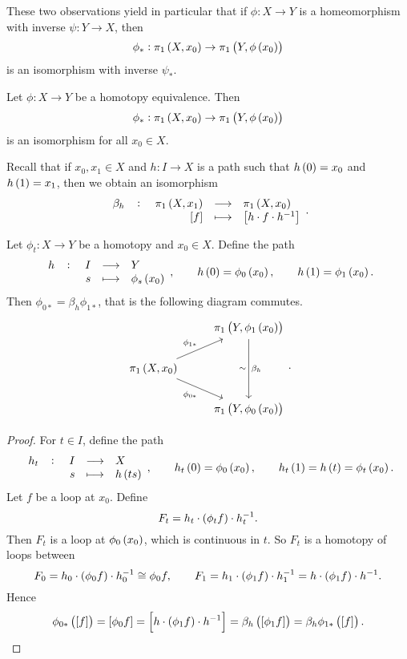 These two observations yield in particular that if $ \phi : X \to Y $ is a homeomorphism with inverse $ \psi : Y \to X $, then
$$ \phi_* : \pi_1\br{X, x_0} \to \pi_1\br{Y, \phi\br{x_0}} $$
is an isomorphism with inverse $ \psi_* $.


\begin{proposition}
\label{prop:1.18}
Let $ \phi : X \to Y $ be a homotopy equivalence. Then
$$ \phi_* : \pi_1\br{X, x_0} \to \pi_1\br{Y, \phi\br{x_0}} $$
is an isomorphism for all $ x_0 \in X $.
\end{proposition}

Recall that if $ x_0, x_1 \in X $ and $ h : I \to X $ is a path such that $ h\br{0} = x_0 $ and $ h\br{1} = x_1 $, then we obtain an isomorphism
$$ \function[\beta_h]{\pi_1\br{X, x_1}}{\pi_1\br{X, x_0}}{\sbr{f}}{\sbr{h \cdot f \cdot h^{-1}}}. $$

\begin{lemma}
\label{lem:1.19}
Let $ \phi_t : X \to Y $ be a homotopy and $ x_0 \in X $. Define the path
$$ \function[h]{I}{Y}{s}{\phi_s\br{x_0}}, \qquad h\br{0} = \phi_0\br{x_0}, \qquad h\br{1} = \phi_1\br{x_0}. $$
Then $ \phi_{0*} = \beta_h\phi_{1*} $, that is the following diagram commutes.
$$
\begin{tikzcd}
& \pi_1\br{Y, \phi_1\br{x_0}} \arrow{dd}{\beta_h}[swap]{\sim} \\
\pi_1\br{X, x_0} \arrow{ur}{\phi_{1*}} \arrow[swap]{dr}{\phi_{0*}} & \\
& \pi_1\br{Y, \phi_0\br{x_0}}
\end{tikzcd}.
$$
\end{lemma}

\pagebreak

\begin{proof}
For $ t \in I $, define the path
$$ \function[h_t]{I}{X}{s}{h\br{ts}}, \qquad h_t\br{0} = \phi_0\br{x_0}, \qquad h_t\br{1} = h\br{t} = \phi_t\br{x_0}. $$
Let $ f $ be a loop at $ x_0 $. Define
$$ F_t = h_t \cdot \br{\phi_tf} \cdot h_t^{-1}. $$
Then $ F_t $ is a loop at $ \phi_0\br{x_0} $, which is continuous in $ t $. So $ F_t $ is a homotopy of loops between
$$ F_0 = h_0 \cdot \br{\phi_0f} \cdot h_0^{-1} \cong \phi_0f, \qquad F_1 = h_1 \cdot \br{\phi_1f} \cdot h_1^{-1} = h \cdot \br{\phi_1f} \cdot h^{-1}. $$
Hence
$$ \phi_{0*}\br{\sbr{f}} = \sbr{\phi_0f} = \sbr{h \cdot \br{\phi_1f} \cdot h^{-1}} = \beta_h\br{\sbr{\phi_1f}} = \beta_h\phi_{1*}\br{\sbr{f}}. $$
\end{proof}

